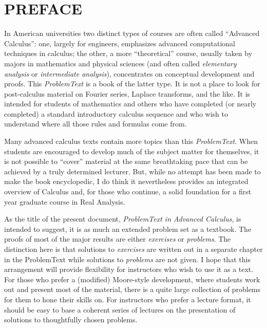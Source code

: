 \chapter*{PREFACE}

In American universities two distinct types of courses are often called ``Advanced
Calculus'': one, largely for engineers, emphasizes advanced computational techniques in
calculus; the other, a more ``theoretical'' course, usually taken by majors in
mathematics and physical sciences (and often called \emph{elementary analysis} or
\emph{intermediate analysis}), concentrates on conceptual development and proofs. This
\emph{ProblemText} is a book of the latter type. It is not a place to look for
post-calculus material on Fourier series, Laplace transforms, and the like.  It is
intended for students of mathematics and others who have completed (or nearly completed)
a standard introductory calculus sequence and who wish to understand where all those
rules and formulas come from.

Many advanced calculus texts contain more topics than this \emph{ProblemText}.  When
students are encouraged to develop much of the subject matter for themselves, it is not
possible to ``cover'' material at the same breathtaking pace that can be achieved by a
truly determined lecturer. But, while no attempt has been made to make the book
encyclopedic, I do think it nevertheless provides an integrated overview of Calculus and,
for those who continue, a solid foundation for a first year graduate course in Real
Analysis.


As the title of the present document, \emph{ProblemText in Advanced Calculus}, is
intended to suggest, it is as much an extended problem set as a textbook.  The proofs of
most of the major results are either \emph{exercises} or \emph{problems}.  The
distinction here is that solutions to \emph{exercises} are written out in a separate
chapter in the ProblemText while solutions to \emph{problems} are not given.  I hope that
this arrangement will provide flexibility for instructors who wish to use it as a text.
For those who prefer a (modified) Moore-style development, where students work out and
present most of the material, there is a quite large collection of problems for them to
hone their skills on.  For instructors who prefer a lecture format, it should be easy to
base a coherent series of lectures on the presentation of solutions to thoughtfully
chosen problems.

